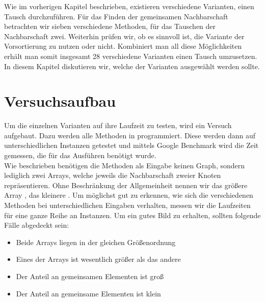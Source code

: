 \label{cap:tests}
Wie im vorherigen Kapitel beschrieben, existieren verschiedene Varianten, einen \gc{} Tausch 
durchzuführen. Für das Finden der gemeinsamen Nachbarschaft betrachten wir sieben verschiedene Methoden, 
für das Tauschen der Nachbarschaft zwei. Weiterhin prüfen wir, ob es sinnvoll ist, 
die Variante der Vorsortierung zu nutzen oder nicht.
Kombiniert man all diese Möglichkeiten erhält man somit insgesamt 28 verschiedene Varianten einen \gc{} 
Tausch umzusetzen.
In diesem Kapitel diskutieren wir, welche der Varianten ausgewählt werden sollte.

\section{Versuchsaufbau}
Um die einzelnen Varianten auf ihre Laufzeit zu testen, wird ein Versuch aufgebaut.
Dazu werden alle Methoden in \cpp programmiert. Diese werden dann auf unterschiedlichen
Instanzen getestet und mittels Google Benchmark \cite{benchmark} wird die Zeit gemessen, 
die für das Ausführen benötigt wurde.
\\

Wie %
beschrieben benötigen die Methoden als Eingabe keinen Graph, 
sondern lediglich zwei Arrays, welche jeweils die Nachbarschaft zweier Knoten repräsentieren. Ohne 
Beschränkung der Allgemeinheit nennen wir das größere Array , das kleinere .
Um möglichst gut zu erkennen, wie sich die verschiedenen Methoden bei unterschiedlichen
Eingaben verhalten, messen wir die Laufzeiten für eine ganze Reihe an Instanzen. 
Um ein gutes Bild zu erhalten, sollten folgende Fälle abgedeckt sein:

\begin{itemize}
	\item Beide Arrays liegen in der gleichen Größenordnung
	
	\item Eines der Arrays ist wesentlich größer als das andere
	
	\item Der Anteil an gemeinsamen Elementen ist groß
	
	\item Der Anteil an gemeinsame Elementen  ist klein
\end{itemize}

